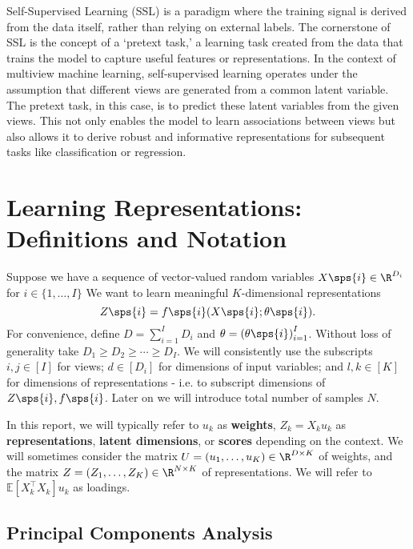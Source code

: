 Self-Supervised Learning (SSL) is a paradigm where the training signal is derived from the data itself, rather than relying on external labels. The cornerstone of SSL is the concept of a `pretext task,' a learning task created from the data that trains the model to capture useful features or representations. In the context of multiview machine learning, self-supervised learning operates under the assumption that different views are generated from a common latent variable. The pretext task, in this case, is to predict these latent variables from the given views. This not only enables the model to learn associations between views but also allows it to derive robust and informative representations for subsequent tasks like classification or regression.

\section{Learning Representations: Definitions and Notation}

Suppose we have a sequence of vector-valued random variables $X\sps{i} \in \R^{D_i}$ for $i \in \{1, \dots, I \}$
We want to learn meaningful $K$-dimensional representations
\begin{equation}\label{eq:general-form-of-representations}
    Z\sps{i} = f\sps{i}( X\sps{i}; \theta\sps{i}).
\end{equation}
For convenience, define $D = \sum_{i=1}^I D_i$ and $\theta = \left(\theta\sps{i}\right)_{i=1}^I$.
Without loss of generality take $D_1 \geq D_2 \geq \cdots \geq D_I$.
We will consistently use the subscripts $i,j \in [I]$ for views;
$d \in [D_i]$ for dimensions of input variables;
and $l,k \in [K]$ for dimensions of representations - i.e. to subscript dimensions of $Z\sps{i}, f\sps{i}$.
Later on we will introduce total number of samples $N$.

In this report, we will typically refer to $u_k$ as \textbf{weights}, $Z_k = X_k u_k$ as \textbf{representations},
        \textbf{latent
dimensions}, or \textbf{scores} depending on the context. We will sometimes consider the
        matrix $U = \left(u_1, \dots, u_K\right) \in \R^{D \times K}$ of weights, and the
        matrix $Z = \left(Z_1, \dots, Z_K\right) \in \R^{N \times K}$ of representations. We will refer to $\mathbb{E
        }[X_k^\top X_k] u_k$ as loadings.

\subsection{Principal Components Analysis}

